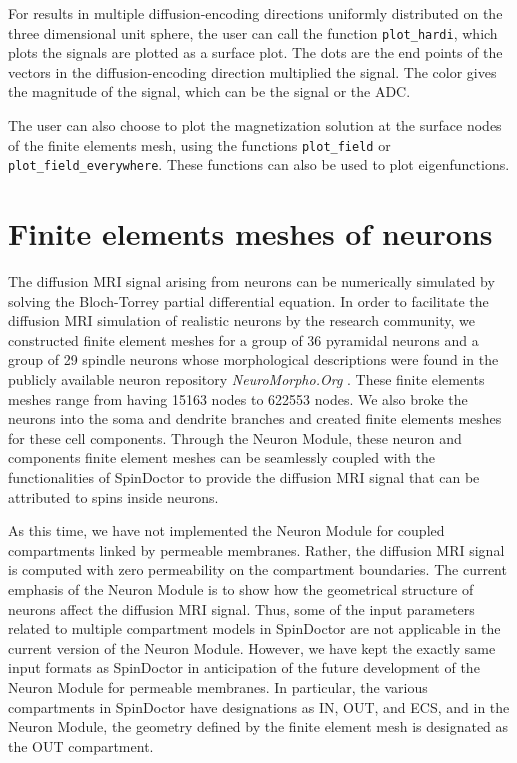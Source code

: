 \documentclass[a4paper]{article}
\begin{document}
For results in multiple diffusion-encoding directions uniformly distributed on the three dimensional unit sphere, the user can call the function \verb+plot_hardi+, which plots the signals are plotted as a surface plot. The dots are the end points of the vectors in the diffusion-encoding direction multiplied the signal. The color gives the magnitude of the signal, which can be the signal or the ADC.

The user can also choose to plot the magnetization solution at the surface nodes of the finite elements mesh, using the functions \verb+plot_field+ or \verb+plot_field_everywhere+. These functions can also be used to plot eigenfunctions.



\section{Finite elements meshes of neurons}

The diffusion MRI signal arising from neurons can be numerically simulated by solving the Bloch-Torrey partial differential equation. In order to facilitate the diffusion MRI simulation of realistic neurons by the research community, we constructed finite element meshes for a group of 36 pyramidal neurons and a group of 29 spindle neurons whose morphological descriptions were found in the publicly available neuron repository {\it NeuroMorpho.Org} \cite{NeuronModule}. These finite elements meshes range from having 15163 nodes to 622553 nodes. We also broke the neurons into the soma and dendrite branches and created finite elements meshes for these cell components. Through the Neuron Module, these neuron and components finite element meshes can be seamlessly coupled with the functionalities of SpinDoctor to provide the diffusion MRI signal that can be attributed to spins inside neurons.

As this time, we have not implemented the Neuron Module for coupled compartments linked by permeable membranes. Rather, the diffusion MRI signal is computed with zero permeability on the compartment boundaries. The current emphasis of the Neuron Module is to show how the geometrical structure of neurons affect the diffusion MRI signal. Thus, some of the input parameters related to multiple compartment models in SpinDoctor are not applicable in the current version of the Neuron Module. However, we have kept the exactly same input formats as SpinDoctor in anticipation of the future development of the Neuron Module for permeable membranes. In particular, the various compartments in SpinDoctor have designations as IN, OUT, and ECS, and in the Neuron Module, the geometry defined by the finite element mesh is designated as the OUT compartment.
\end{document}
